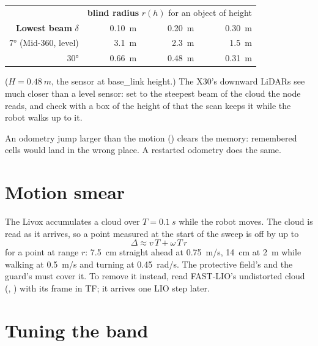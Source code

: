 \begin{center}
\begin{small}
\begin{tabular}{@{}rrrr@{}}
  \toprule
  & \multicolumn{3}{c}{\textbf{blind radius} $r(h)$ for an object of height} \\
  \textbf{Lowest beam} $\delta$ & \SI{0.10}{m} & \SI{0.20}{m} & \SI{0.30}{m} \\
  \midrule
  \ang{7} (Mid-360, level) & \SI{3.1}{m} & \SI{2.3}{m} & \SI{1.5}{m} \\
  \ang{30} & \SI{0.66}{m} & \SI{0.48}{m} & \SI{0.31}{m} \\
  \bottomrule
\end{tabular}
\end{small}
\end{center}
\noindent ($H = \SI{0.48}{m}$, the sensor at base\_link height.) The X30's downward LiDARs see much
closer than a level sensor: set  to the steepest beam of the cloud the node
reads, and check with a box of the height of  that the scan keeps it while the
robot walks up to it.

\begin{warnbox}
An odometry jump larger than the motion () clears the memory: remembered cells
would land in the wrong place. A restarted odometry does the same.
\end{warnbox}

\section{Motion smear}

The Livox accumulates a cloud over $T = \SI{0.1}{s}$ while the robot moves. The cloud is read
as it arrives, so a point measured at the start of the sweep is off by up to
\begin{equation}
  \Delta \approx v\,T + \omega\,T\,r
\end{equation}
for a point at range $r$: \SI{7.5}{cm} straight ahead at \SI{0.75}{m/s}, \SI{14}{cm} at \SI{2}{m}
while walking at \SI{0.5}{m/s} and turning at \SI{0.45}{rad/s}. The protective field's
 and the guard's  must cover it. To remove it instead,
read FAST-LIO's undistorted cloud (,
) with its frame in TF; it arrives one LIO
step later.

\section{Tuning the band}

